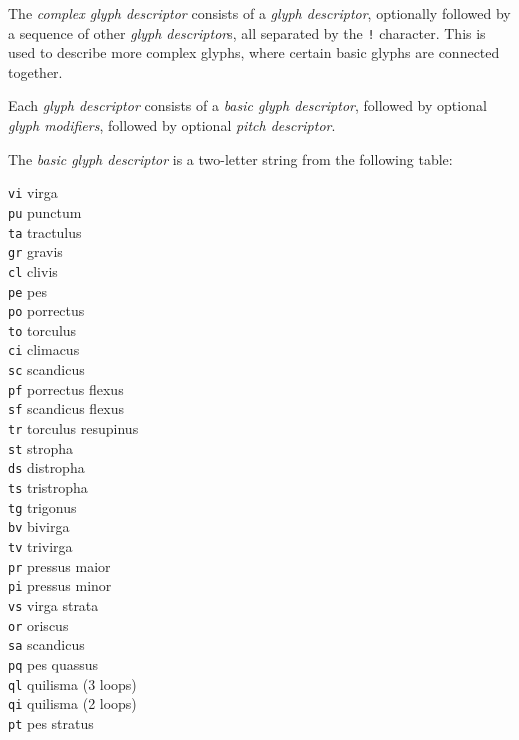 \documentclass[a4paper]{article}
\begin{document}
{The \textit{complex glyph descriptor} consists of a \textit{glyph descriptor},
optionally followed by a sequence of other \textit{glyph descriptor}s, all
separated by the \texttt{!} character.  This is used to describe more
complex glyphs, where certain basic glyphs are connected together.

Each \textit{glyph descriptor} consists of a \textit{basic glyph descriptor},
followed by optional \textit{glyph modifiers}, followed by optional
\textit{pitch descriptor}.

The \textit{basic glyph descriptor} is a two-letter string from the
following table:
\begin{multicols}{5}
\texttt{vi}  virga\\
\texttt{pu}  punctum\\
\texttt{ta}  tractulus\\
\texttt{gr}  gravis\\
\texttt{cl}  clivis\\
\texttt{pe}  pes\\
\texttt{po}  porrectus\\
\texttt{to}  torculus\\
\texttt{ci}  climacus\\
\texttt{sc}  scandicus\\
\texttt{pf}  porrectus flexus\\
\texttt{sf}  scandicus flexus\\
\texttt{tr}  torculus resupinus\\
\texttt{st}  stropha\\
\texttt{ds}  distropha\\
\texttt{ts}  tristropha\\
\texttt{tg}  trigonus\\
\texttt{bv}  bivirga\\
\texttt{tv}  trivirga\\
\texttt{pr}  pressus maior\\
\texttt{pi}  pressus minor\\
\texttt{vs}  virga strata\\
\texttt{or}  oriscus\\
\texttt{sa}  scandicus\\
\texttt{pq}  pes quassus\\
\texttt{ql}  quilisma (3 loops)\\
\texttt{qi}  quilisma (2 loops)\\
\texttt{pt}  pes stratus
\end{multicols}

}
\end{document}
